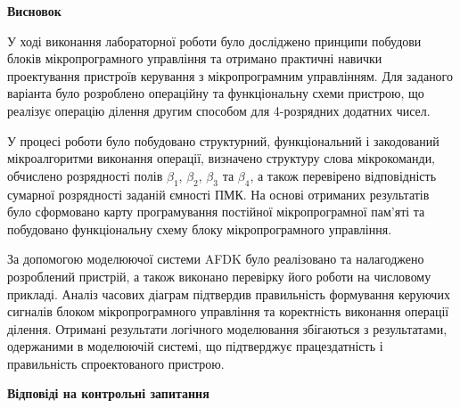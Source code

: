 \documentclass[12pt,a4paper]{article}
\begin{document}
    \begin{center} \textbf{\large Висновок}\end{center}

    У ході виконання лабораторної роботи було досліджено принципи побудови блоків мікропрограмного управління та отримано практичні навички проектування пристроїв керування з мікропрограмним управлінням. Для заданого варіанта було розроблено операційну та функціональну схеми пристрою, що реалізує операцію ділення другим способом для 4-розрядних додатних чисел.

    У процесі роботи було побудовано структурний, функціональний і закодований мікроалгоритми виконання операції, визначено структуру слова мікрокоманди, обчислено розрядності полів $\beta_1$, $\beta_2$, $\beta_3$ та $\beta_4$, а також перевірено відповідність сумарної розрядності заданій ємності ПМК. На основі отриманих результатів було сформовано карту програмування постійної мікропрограмної пам’яті та побудовано функціональну схему блоку мікропрограмного управління.

    За допомогою моделюючої системи AFDK було реалізовано та налагоджено розроблений пристрій, а також виконано перевірку його роботи на числовому прикладі. Аналіз часових діаграм підтвердив правильність формування керуючих сигналів блоком мікропрограмного управління та коректність виконання операції ділення. Отримані результати логічного моделювання збігаються з результатами, одержаними в моделюючій системі, що підтверджує працездатність і правильність спроектованого пристрою.

    \begin{center} \textbf{\large Відповіді на контрольні запитання} \end{center}
\end{document}
